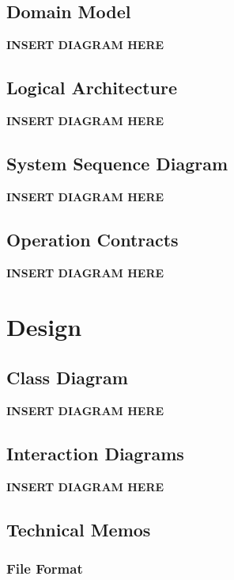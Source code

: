 \documentclass[11pt]{article}
\begin{document}
\subsection{Domain Model}
\label{sec-2-3}

   \textbf{INSERT DIAGRAM HERE}
\subsection{Logical Architecture}
\label{sec-2-4}

   \textbf{INSERT DIAGRAM HERE}
\subsection{System Sequence Diagram}
\label{sec-2-5}

   \textbf{INSERT DIAGRAM HERE}
\subsection{Operation Contracts}
\label{sec-2-6}

   \textbf{INSERT DIAGRAM HERE}
\section{Design}
\label{sec-3}
\subsection{Class Diagram}
\label{sec-3-1}

   \textbf{INSERT DIAGRAM HERE} 
\subsection{Interaction Diagrams}
\label{sec-3-2}

   \textbf{INSERT DIAGRAM HERE}  
\subsection{Technical Memos}
\label{sec-3-3}
\subsubsection{File Format}
\label{sec-3-3-1}
\end{document}
